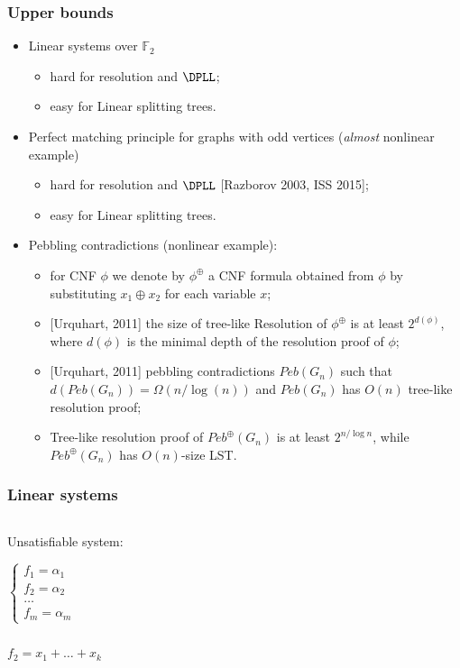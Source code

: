 \begin{frame}
    \frametitle{Upper bounds}

    \begin{itemize}
		\item Linear systems over $\mathbb{F}_2$
			\begin{itemize}
				\item hard for resolution and $\DPLL$;
				\item easy for Linear splitting trees.
			\end{itemize}
        \pause
		\item Perfect matching principle for graphs with odd vertices (\textit{almost} nonlinear example)
			\begin{itemize}
				\item hard for resolution and $\DPLL$ [Razborov 2003, ISS 2015];
				\item easy for Linear splitting trees.
			\end{itemize}
        \pause
		\item Pebbling contradictions (nonlinear example):
			\begin{itemize}
				\item for CNF $\phi$ we denote by $\phi^{\oplus}$ a CNF formula obtained from $\phi$ by substituting $x_1 \oplus
					x_2$ for each variable $x$;
				\item{} [Urquhart, 2011] the size of tree-like Resolution of $\phi^{\oplus}$ is at least $2^{d(\phi)}$, where
					$d(\phi)$ is the minimal depth of the resolution proof of $\phi$;
				\item{} [Urquhart, 2011] pebbling contradictions $Peb(G_n)$ such that $d(Peb(G_n)) = \Omega(n / \log(n))$ and
					$Peb(G_n)$ has $O(n)$ tree-like resolution proof;
				\item Tree-like resolution proof of $Peb^\oplus(G_n)$ is at least $2^{n / \log n}$, while $Peb^\oplus(G_n)$ has $O(n)$-size LST. 
			\end{itemize}
	\end{itemize}
\end{frame}




\begin{frame}
    \frametitle{Linear systems}

    \begin{columns}
		\begin{column}{1cm}
			Unsatisfiable system:

			$\left\{ \begin{aligned}
				f_1 = \alpha_1 \\
				f_2 = \alpha_2 \\
				\dots\\
				f_m = \alpha_m
			\end{aligned}\right.$
		\end{column}


		\begin{column}{9cm}
			
		\end{column}
	\end{columns}

	$f_2 = x_1 + \dots + x_k$
\end{frame}


